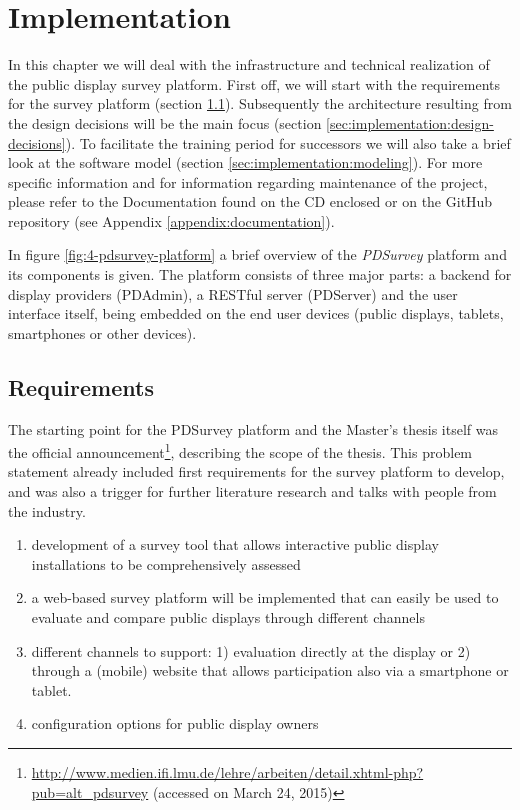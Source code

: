 \section{Implementation}
\label{sec:implementation}

	In this chapter we will deal with the infrastructure and technical realization of the public display survey platform. First off, we will start with the requirements for the survey platform (section \ref{sec:implementation:requirements}). Subsequently the architecture resulting from the design decisions will be the main focus (section \ref{sec:implementation:design-decisions}). To facilitate the training period for successors we will also take a brief look at the software model (section \ref{sec:implementation:modeling}). For more specific information and for information regarding maintenance of the project, please refer to the Documentation found on the CD enclosed or on the GitHub repository (see Appendix \ref{appendix:documentation}).

	In figure \ref{fig:4-pdsurvey-platform} a brief overview of the \textit{PDSurvey} platform and its components is given. The platform consists of three major parts: a backend for display providers (PDAdmin), a RESTful server (PDServer) and the user interface itself, being embedded on the end user devices (public displays, tablets, smartphones or other devices). 






\subsection{Requirements}
\label{sec:implementation:requirements}

	The starting point for the PDSurvey platform and the Master's thesis itself was the official announcement\footnote{\url{http://www.medien.ifi.lmu.de/lehre/arbeiten/detail.xhtml-php?pub=alt_pdsurvey} (accessed on March 24, 2015)}, describing the scope of the thesis. This problem statement already included first requirements for the survey platform to develop, and was also a trigger for further literature research and talks with people from the industry.

	\begin{enumerate}[itemsep=0pt] 
	\item development of a survey tool that allows interactive public display installations to be comprehensively assessed 
	\item a web-based survey platform will be implemented that can easily be used to evaluate and compare public displays through different channels 
	\item different channels to support: 1) evaluation directly at
	the display or 2) through a (mobile) website that allows participation also via a smartphone
	or tablet.
	\item configuration options for public display owners
	\end{enumerate}

